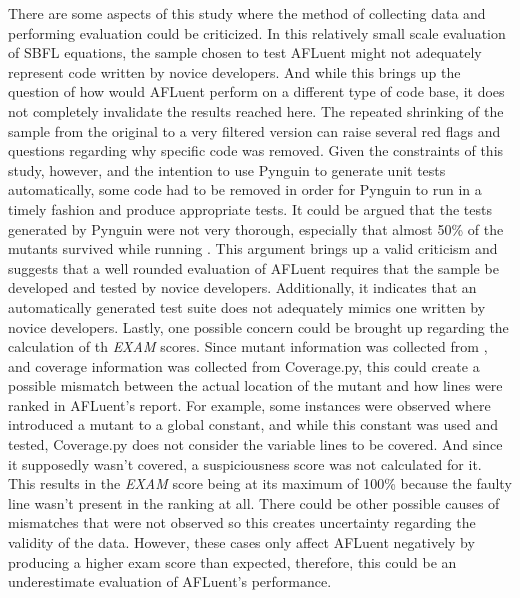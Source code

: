 There are some aspects of this study where the method of collecting data and
performing evaluation could be criticized. In this relatively small scale
evaluation of SBFL equations, the sample chosen to test AFLuent might not
adequately represent code written by novice developers. And while this brings up
the question of how would AFLuent perform on a different type of code base, it
does not completely invalidate the results reached here. The repeated shrinking of the
sample from the original  to a very filtered version
can raise several red flags and questions regarding why specific code was
removed. Given the constraints of this study, however, and the intention to
use Pynguin to generate unit tests automatically, some code had to be removed in order
for Pynguin to run in a timely fashion and produce appropriate tests. It could
be argued that the tests generated by Pynguin were not very thorough, especially
that almost 50\% of the mutants survived while running . This
argument brings up a valid criticism and suggests that a well rounded evaluation
of AFLuent requires that the sample be developed and tested by novice developers. Additionally, it indicates that an automatically generated
test suite does not adequately mimics one written by novice developers.
Lastly, one possible concern could be brought up regarding the calculation of th
\emph{EXAM} scores. Since mutant information was collected from ,
and coverage information was collected from Coverage.py, this could create a
possible mismatch between the actual location of the mutant and how lines were
ranked in AFLuent's report. For example, some instances were observed where
 introduced a mutant to a global constant, and while this constant
was used and tested, Coverage.py does not consider the variable lines to be
covered. And since it supposedly wasn't covered, a suspiciousness score was not
calculated for it. This results in the \emph{EXAM} score being at its maximum of
100\% because the faulty line wasn't present in the ranking at all. There could
be other possible causes of mismatches that were not observed so this creates
uncertainty regarding the validity of the data. However, these cases only affect
AFLuent negatively by producing a higher exam score than expected, therefore,
this could be an underestimate evaluation of AFLuent's performance.